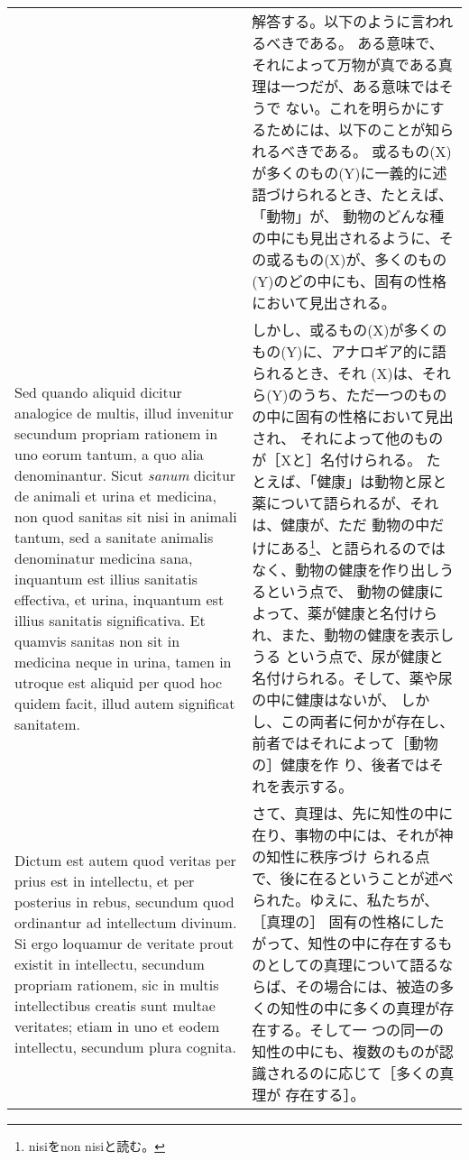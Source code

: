 \documentclass[10pt]{jsarticle} %
\begin{document}
\begin{longtable}{p{21em}p{21em}}
&

解答する。以下のように言われるべきである。
ある意味で、それによって万物が真である真理は一つだが、ある意味ではそうで
 ない。これを明らかにするためには、以下のことが知られるべきである。
或るもの(X)が多くのもの(Y)に一義的に述語づけられるとき、たとえば、「動物」が、
 動物のどんな種の中にも見出されるように、その或るもの(X)が、多くのもの
 (Y)のどの中にも、固有の性格において見出される。

\\



Sed quando aliquid dicitur
analogice de multis, illud invenitur secundum propriam rationem in uno
eorum tantum, a quo alia denominantur. Sicut {\itshape sanum} dicitur de animali et
urina et medicina, non quod sanitas sit nisi in animali tantum, sed a
sanitate animalis denominatur medicina sana, inquantum est illius
sanitatis effectiva, et urina, inquantum est illius sanitatis
significativa. Et quamvis sanitas non sit in medicina neque in urina,
tamen in utroque est aliquid per quod hoc quidem facit, illud autem
significat sanitatem. 


&

しかし、或るもの(X)が多くのもの(Y)に、アナロギア的に語られるとき、それ
 (X)は、それら(Y)のうち、ただ一つのものの中に固有の性格において見出され、
 それによって他のものが［Xと］名付けられる。
たとえば、「健康」は動物と尿と薬について語られるが、それは、健康が、ただ
 動物の中だけにある\footnote{nisiをnon nisiと読む。}、と語られるのではなく、動物の健康を作り出しうるという点で、
 動物の健康によって、薬が健康と名付けられ、また、動物の健康を表示しうる
 という点で、尿が健康と名付けられる。そして、薬や尿の中に健康はないが、
 しかし、この両者に何かが存在し、前者ではそれによって［動物の］健康を作
 り、後者ではそれを表示する。

\\




Dictum est autem quod veritas per prius est in
intellectu, et per posterius in rebus, secundum quod ordinantur ad
intellectum divinum. Si ergo loquamur de veritate prout existit in
intellectu, secundum propriam rationem, sic in multis intellectibus
creatis sunt multae veritates; etiam in uno et eodem intellectu,
secundum plura cognita. 



&

さて、真理は、先に知性の中に在り、事物の中には、それが神の知性に秩序づけ
られる点で、後に在るということが述べられた。ゆえに、私たちが、［真理の］
固有の性格にしたがって、知性の中に存在するものとしての真理について語るな
らば、その場合には、被造の多くの知性の中に多くの真理が存在する。そして一
 つの同一の知性の中にも、複数のものが認識されるのに応じて［多くの真理が
 存在する］。


\end{longtable}
\end{document}
